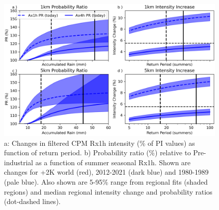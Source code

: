 \documentclass[11pt,a4paper]{article}
\begin{document}
\begin{figure}
	\centering
	\includegraphics[width=1\linewidth]{PR}
	\caption{a: Changes in filtered CPM Rx1h intensity (\% of PI values) as function of return period. b) Probability ratio (\%) relative to Pre-industrial as a function of summer seasonal Rx1h. Shown are changes for +2K world (red), 2012-2021 (dark blue) and 1980-1989 (pale blue). Also shown are 5-95\% range from regional fits (shaded regions) and median regional intensity change and probability ratios (dot-dashed lines).}
	\label{fig:int_pr}
\end{figure}
\end{document}
